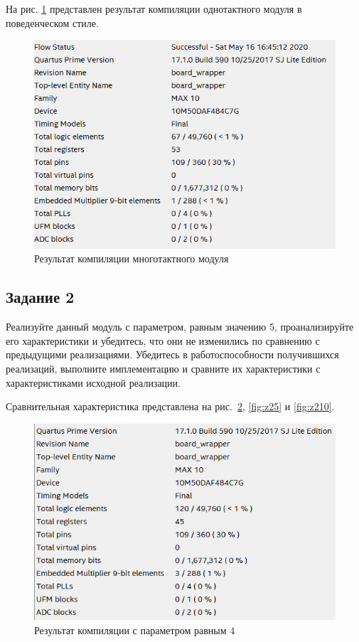 \documentclass[a4paper,14pt]{article}
\begin{document}
	На рис. \ref{fig:z106} представлен результат компиляции однотактного модуля в поведенческом стиле.
	
	{\small {}}
	
	\begin{figure}[H]
		\centering
		\includegraphics[width=0.8\linewidth]{images/z1_06}
		\caption{Результат компиляции многотактного модуля}
		\label{fig:z106}
	\end{figure}
		
	
	\subsection{Задание 2}
	
	Реализуйте данный модуль с параметром, равным значению 5, проанализируйте его характеристики и убедитесь, что они не изменились по сравнению с предыдущими	реализациями. Убедитесь в работоспособности получившихся реализаций, выполните имплементацию и сравните их характеристики с характеристиками исходной реализации.
	
	Сравнительная характеристика представлена на рис.~\ref{fig:z24}, \ref{fig:z25} и \ref{fig:z210}.
	
	\begin{figure}[H]
		\centering
		\includegraphics[width=0.8\linewidth]{images/z2_4}
		\caption{Результат компиляции с параметром равным 4}
		\label{fig:z24}
	\end{figure}
	
\end{document}
